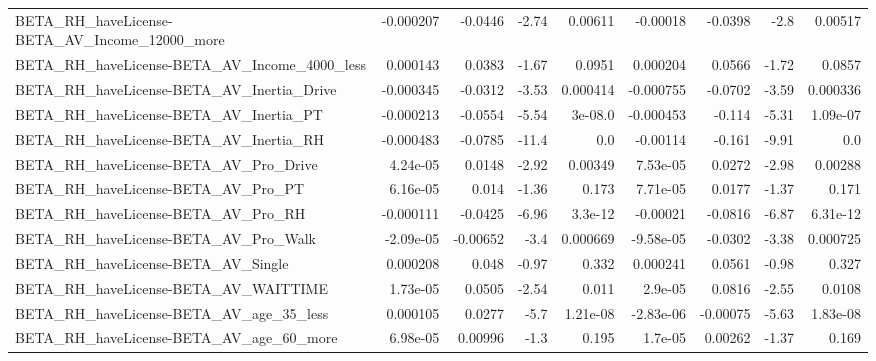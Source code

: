 \begin{tabular}{lrrrrrrrr}
BETA\_RH\_haveLicense-BETA\_AV\_Income\_12000\_more      &   -0.000207 &      -0.0446 &    -2.74 &  0.00611 &   -0.00018 &     -0.0398 &         -2.8 &       0.00517 \\
BETA\_RH\_haveLicense-BETA\_AV\_Income\_4000\_less       &    0.000143 &       0.0383 &    -1.67 &   0.0951 &   0.000204 &      0.0566 &        -1.72 &        0.0857 \\
BETA\_RH\_haveLicense-BETA\_AV\_Inertia\_Drive          &   -0.000345 &      -0.0312 &    -3.53 & 0.000414 &  -0.000755 &     -0.0702 &        -3.59 &      0.000336 \\
BETA\_RH\_haveLicense-BETA\_AV\_Inertia\_PT             &   -0.000213 &      -0.0554 &    -5.54 &  3e-08.0 &  -0.000453 &      -0.114 &        -5.31 &      1.09e-07 \\
BETA\_RH\_haveLicense-BETA\_AV\_Inertia\_RH             &   -0.000483 &      -0.0785 &    -11.4 &      0.0 &   -0.00114 &      -0.161 &        -9.91 &           0.0 \\
BETA\_RH\_haveLicense-BETA\_AV\_Pro\_Drive              &    4.24e-05 &       0.0148 &    -2.92 &  0.00349 &   7.53e-05 &      0.0272 &        -2.98 &       0.00288 \\
BETA\_RH\_haveLicense-BETA\_AV\_Pro\_PT                 &    6.16e-05 &        0.014 &    -1.36 &    0.173 &   7.71e-05 &      0.0177 &        -1.37 &         0.171 \\
BETA\_RH\_haveLicense-BETA\_AV\_Pro\_RH                 &   -0.000111 &      -0.0425 &    -6.96 &  3.3e-12 &   -0.00021 &     -0.0816 &        -6.87 &      6.31e-12 \\
BETA\_RH\_haveLicense-BETA\_AV\_Pro\_Walk               &   -2.09e-05 &     -0.00652 &     -3.4 & 0.000669 &  -9.58e-05 &     -0.0302 &        -3.38 &      0.000725 \\
BETA\_RH\_haveLicense-BETA\_AV\_Single                 &    0.000208 &        0.048 &    -0.97 &    0.332 &   0.000241 &      0.0561 &        -0.98 &         0.327 \\
BETA\_RH\_haveLicense-BETA\_AV\_WAITTIME               &    1.73e-05 &       0.0505 &    -2.54 &    0.011 &    2.9e-05 &      0.0816 &        -2.55 &        0.0108 \\
BETA\_RH\_haveLicense-BETA\_AV\_age\_35\_less            &    0.000105 &       0.0277 &     -5.7 & 1.21e-08 &  -2.83e-06 &    -0.00075 &        -5.63 &      1.83e-08 \\
BETA\_RH\_haveLicense-BETA\_AV\_age\_60\_more            &    6.98e-05 &      0.00996 &     -1.3 &    0.195 &    1.7e-05 &     0.00262 &        -1.37 &         0.169 \\

\end{tabular}
